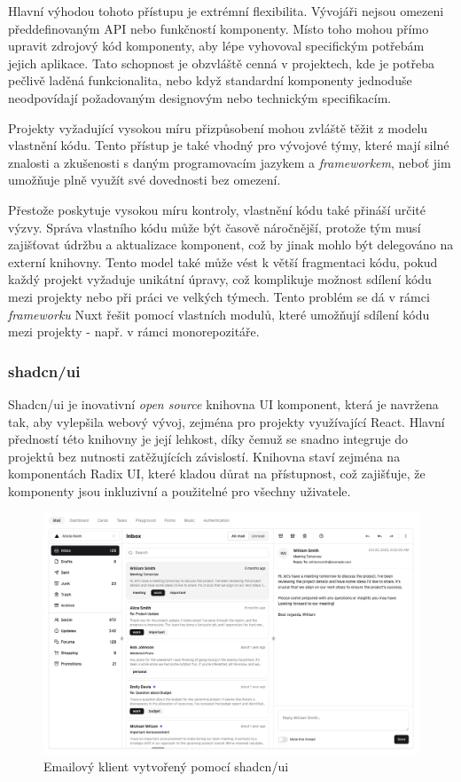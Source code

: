 Hlavní výhodou tohoto přístupu je extrémní flexibilita. Vývojáři nejsou omezeni předdefinovaným API nebo funkčností komponenty. Místo toho mohou přímo upravit zdrojový kód komponenty, aby lépe vyhovoval specifickým potřebám jejich aplikace. Tato schopnost je obzvláště cenná v projektech, kde je potřeba pečlivě laděná funkcionalita, nebo když standardní komponenty jednoduše neodpovídají požadovaným designovým nebo technickým specifikacím.

Projekty vyžadující vysokou míru přizpůsobení mohou zvláště těžit z modelu vlastnění kódu. Tento přístup je také vhodný pro vývojové týmy, které mají silné znalosti a zkušenosti s daným programovacím jazykem a \emph{frameworkem}, neboť jim umožňuje plně využít své dovednosti bez omezení.

Přestože poskytuje vysokou míru kontroly, vlastnění kódu také přináší určité výzvy. Správa vlastního kódu může být časově náročnější, protože tým musí zajišťovat údržbu a aktualizace komponent, což by jinak mohlo být delegováno na externí knihovny. Tento model také může vést k větší fragmentaci kódu, pokud každý projekt vyžaduje unikátní úpravy, což komplikuje možnost sdílení kódu mezi projekty nebo při práci ve velkých týmech. Tento problém se dá v rámci \emph{frameworku} Nuxt řešit pomocí vlastních modulů, které umožňují sdílení kódu mezi projekty - např. v rámci monorepozitáře.

\subsubsection{shadcn/ui}
Shadcn/ui je inovativní \emph{open source} knihovna UI komponent, která je navržena tak, aby vylepšila webový vývoj, zejména pro projekty využívající React.
Hlavní předností této knihovny je její lehkost, díky čemuž se snadno integruje do projektů bez nutnosti zatěžujících závislostí. Knihovna staví
zejména na komponentách Radix UI, které kladou důrat na přístupnost, což zajišťuje, že komponenty jsou inkluzivní a použitelné pro všechny uživatele. \cite{ShadcnUI}

\begin{figure}[H]
    \includegraphics[width=\textwidth]{images/shadcn}
    \caption{Emailový klient vytvořený pomocí shadcn/ui} \label{picture:shadcn}
\end{figure}

